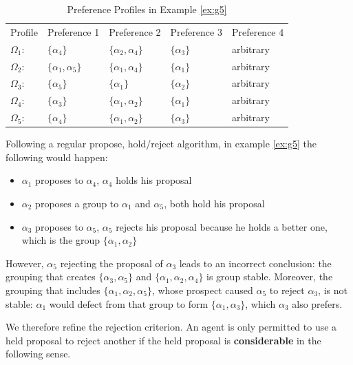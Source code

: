 \documentclass{elsarticle}
\begin{document}
\begin{table}[h]
\centering
\caption{Preference Profiles in Example \ref{ex:g5}}
\label{tab:g5}
\begin{tabular}{lllll}
Profile     & Preference 1              & Preference 2              & Preference 3   & Preference 4 \\
$\Omega_1$: & $\{\alpha_4\}$            & $\{\alpha_2 , \alpha_4\}$ & $\{\alpha_3\}$ & arbitrary    \\
$\Omega_2$: & $\{\alpha_1 , \alpha_5\}$ & $\{\alpha_1 , \alpha_4\}$ & $\{\alpha_1\}$ & arbitrary    \\
$\Omega_3$: & $\{\alpha_5\}$            & $\{\alpha_1\}$            & $\{\alpha_2\}$ & arbitrary    \\
$\Omega_4$: & $\{\alpha_3\}$            & $\{\alpha_1 , \alpha_2\}$ & $\{\alpha_1\}$ & arbitrary    \\
$\Omega_5$: & $\{\alpha_4\}$            & $\{\alpha_1 , \alpha_2\}$ & $\{\alpha_3\}$ & arbitrary   
\end{tabular}
\end{table}

Following a regular propose, hold/reject algorithm, in example \ref{ex:g5} the following would happen:

\begin{itemize}
\item $\alpha_1$ proposes to $\alpha_4$, $\alpha_4$ holds his proposal
\item $\alpha_2$ proposes a group to $\alpha_1$ and $\alpha_5$, both hold his proposal
\item $\alpha_3$ proposes to $\alpha_5$, $\alpha_5$ rejects his proposal because he holds a better one, which is the group $\{ \alpha_1 , \alpha_2 \}$
\end{itemize}

However, $\alpha_5$ rejecting the proposal of $\alpha_3$ leads to an incorrect conclusion: the grouping that creates $\{\alpha_3 , \alpha_5 \}$ and $\{ \alpha_1 , \alpha_2 , \alpha_4 \}$ is group stable. Moreover, the grouping that includes $\{ \alpha_1 , \alpha_2 , \alpha_5 \}$, whose prospect caused $\alpha_5$ to reject $\alpha_3$, is not stable: $\alpha_1$ would defect from that group to form $\{ \alpha_1 , \alpha_3 \}$, which $\alpha_3$ also prefers.

We therefore refine the rejection criterion. An agent is only permitted to use a held proposal to reject another if the held proposal is \textbf{considerable} in the following sense.
\end{document}
